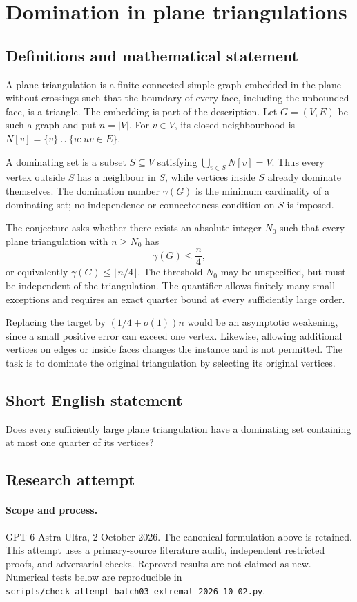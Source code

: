 \documentclass[11pt,a4paper]{article}
\begin{document}
\section*{Domination in plane triangulations}\label{statement}

\subsection{Definitions and mathematical statement}
A plane triangulation is a finite connected simple graph embedded in
the plane without crossings such that the boundary of every face,
including the unbounded face, is a triangle. The embedding is part
of the description. Let $G=(V,E)$ be such a graph and put $n=|V|$.
For $v\in V$, its closed neighbourhood is
$N[v]=\{v\}\cup\{u:uv\in E\}$.

A dominating set is a subset $S\subseteq V$ satisfying
$\bigcup_{v\in S}N[v]=V$. Thus every vertex outside $S$ has a neighbour
in $S$, while vertices inside $S$ already dominate themselves.
The domination number $\gamma(G)$ is the minimum cardinality of a
dominating set; no independence or connectedness condition on $S$
is imposed.

The conjecture asks whether there exists an absolute integer $N_0$
such that every plane triangulation with $n\ge N_0$ has
\[
                             \gamma(G)\le\frac n4,
\]
or equivalently $\gamma(G)\le\lfloor n/4\rfloor$. The threshold $N_0$
may be unspecified, but must be independent of the triangulation.
The quantifier allows finitely many small exceptions and requires an
exact quarter bound at every sufficiently large order.

Replacing the target by $(1/4+o(1))n$ would be an asymptotic weakening,
since a small positive error can exceed one vertex. Likewise,
allowing additional vertices on edges or inside faces changes the
instance and is not permitted. The task is to dominate the original
triangulation by selecting its original vertices.
\subsection{Short English statement}
Does every sufficiently large plane triangulation have a dominating set containing at most one quarter of its vertices?
\subsection{Research attempt}
\paragraph{Scope and process.}
GPT-6 Astra Ultra, 2 October 2026. The canonical formulation above is retained. This attempt uses a primary-source literature audit, independent restricted proofs, and adversarial checks. Reproved results are not claimed as new. Numerical tests below are reproducible in \texttt{scripts/check\_attempt\_batch03\_extremal\_2026\_10\_02.py}.
\end{document}
